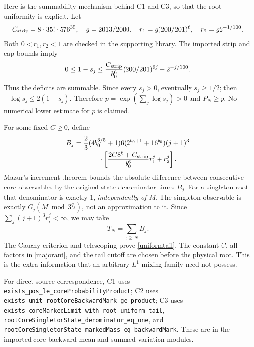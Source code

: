 \documentclass[11pt,a4paper]{article}
\theoremstyle{definition}\newtheorem{definition}[theorem]{Definition}
\theoremstyle{remark}\newtheorem{remark}[theorem]{Remark}
\newcommand{\code}[1]{{\small\nolinkurl{#1}}}
\begin{document}
Here is the summability mechanism behind C1 and C3, so that the root
uniformity is explicit. Let
\[
 C_{\rm strip}=8\cdot35!\cdot576^{35},\quad g=2013/2000,\quad
 r_1=g(200/201)^6,\quad r_2=g2^{-1/100}.
\]
Both $0<r_1,r_2<1$ are checked in the supporting library. The imported
strip and cap bounds imply
\begin{equation}\label{deficits}
 0\le1-s_j\le \frac{C_{\rm strip}}{b_0^6}(200/201)^{6j}+2^{-j/100}.
\end{equation}
Thus the deficits are summable. Since every $s_j>0$, eventually $s_j\ge1/2$;
then $-\log s_j\le2(1-s_j)$. Therefore
$p=\exp(\sum_j\log s_j)>0$ and $P_N\ge p$. No numerical lower estimate
for $p$ is claimed.

For some fixed $C\ge0$, define
\begin{align}
 B_j={}&\frac23(4b_0^{3/5}+1)6(2^{b_0+1}+16^{b_0})(j+1)^3\notag\\[-2pt]
 &\hspace{8mm}\cdot\left[\frac{2C8^6+C_{\rm strip}}{b_0^6}r_1^j+r_2^j\right].\label{majorant}
\end{align}
Mazur's increment theorem bounds the absolute difference between consecutive
core observables by the original state denominator times $B_j$. For a
singleton root that denominator is exactly $1$, \emph{independently of $M$}.
The singleton observable is exactly $G_j(M\bmod3^{q_j})$, not an approximation
to it. Since $\sum_j(j+1)^3r_i^j<\infty$, we may take
\[
 T_N=\sum_{j\ge N}B_j.
\]
The Cauchy criterion and telescoping prove \eqref{uniformtail}. The
constant $C$, all factors in \eqref{majorant}, and the tail cutoff are
chosen before the physical root. This is the extra information that an
arbitrary $L^1$-mixing family need not possess.

For direct source correspondence, C1 uses
\code{exists_pos_le_coreProbabilityProduct}; C2 uses
\code{exists_unit_rootCoreBackwardMark_ge_product}; C3 uses
\code{exists_coreMarkedLimit_with_root_uniform_tail},
\code{rootCoreSingletonState_denominator_eq_one}, and
\code{rootCoreSingletonState_markedMass_eq_backwardMark}.
These are in the imported core backward-mean and summed-variation modules.
\end{document}
